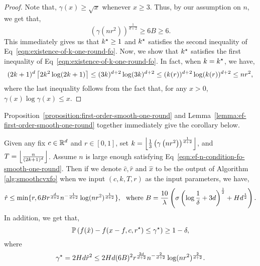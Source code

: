 \begin{proof}
Note that, $\gamma(x) \geq \sqrt{x}$ whenever $x \geq 3$. 
Thus, by our assumption on $n$, we get that, 
\begin{equation*}
\left(\gamma(nr^2)\right)^\frac{1}{d+2} \geq 6B \geq 6. 
\end{equation*}
This immediately gives us that $k^\star \geq 1$ and $k^\star$ satisfies the second 
inequality of Eq~\eqref{eqn:existence-of-k-one-round-fo}. Now, we 
show that $k^\star$ satisfies the first inequality of Eq~\eqref{eqn:existence-of-k-one-round-fo}.
In fact, when $k=k^\star$, we have, 
\begin{equation*}
(2k+1)^d \left\lceil{2k^2 \log(2k+1)}\right\rceil \leq (3k)^{d+2} \log (3k)^{d+2} \leq
	 (k(r))^{d+2} \log (k(r))^{d+2} \leq nr^2,
\end{equation*}
where the last inequality follows from the fact that, for any $x > 0$, 
$\gamma(x) \log \gamma(x) \leq x$.
\end{proof}
Proposition~\ref{proposition:first-order-smooth-one-round} and 
Lemma~\ref{lemma:ef-first-order-smooth-one-round} together 
immediately give the corollary below. 

\begin{corollary}
\label{corollary:first-order-smooth-one-round}
Given any fix $c\in \mathbb{R}^d$ and $r \in [0, 1]$, set 
$k = \left\lfloor{\frac{1}{3} \left(\gamma\left(nr^2\right)\right)^\frac{1}{d+2}}\right\rfloor$,
and $T = \left\lfloor{\frac{n}{(2k+1)^d}}\right\rfloor$. Assume $n$ is large enough 
satisfying Eq~\eqref{eqn:ef-n-condition-fo-smooth-one-round}. Then 
if we denote $\hat{c}, \hat{r}$ and $\hat{x}$ to be the output of Algorithm
\ref{alg:smoothcvxfo} when we input $(c, k, T, r)$ as the input parameters, 
we have, 
\begin{equation*}
\hat{r} \leq \min\{r, 6B r^\frac{d}{d+2} n^{-\frac{1}{d+2}} \log (nr^2)^\frac{1}{d+2}\},
~~\text{where}~
	B =  \frac{10}{\lambda} \left(\sigma \left(\log \frac{1}{\delta} + 3d\right)^{\frac{1}{2}}+Hd^{\frac{1}{2}}\right).
\end{equation*}
In addition, we get that, 
\begin{equation*}
\mathbb{P}\left(f(\hat{x}) - f(x-{f, c, r}^\star) \leq \gamma^\star \right) \geq 1-\delta, 
\end{equation*}
where 
\begin{equation*}
\gamma^\star = 2 Hd \hat{r}^2 \leq 2 Hd  (6B)^2 
	r^\frac{2d}{d+2} n^{-\frac{2}{d+2}} \log (nr^2)^\frac{2}{d+2}.
\end{equation*}
\end{corollary}


